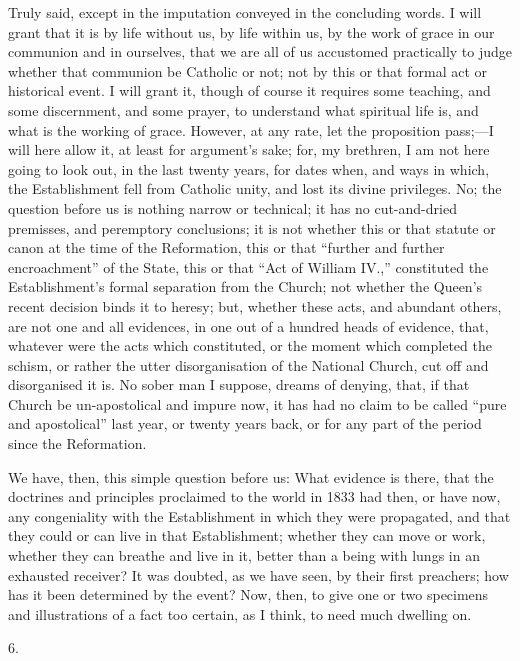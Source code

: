 Truly said, except in the imputation conveyed in the concluding
words. I will grant that it is by life without us, by life within us,
by the work of grace in our communion and in ourselves, that we are
all of us accustomed practically to judge whether that communion be
Catholic or not; not by this or that formal act or historical event. I
will grant it, though of course it requires some teaching, and some
discernment, and some prayer, to understand what spiritual life is,
and what is the working of grace. However, at any rate, let the
proposition pass;—I will here allow it, at least for argument's
sake; for, my brethren, I am not here going to look out, in the last
twenty years, for dates when, and ways in which, the Establishment
fell from Catholic unity, and lost its divine privileges. No; the
question before us is nothing narrow or technical; it has no
cut-and-dried premisses, and peremptory conclusions; it is not whether
this or that statute or canon at the time of the Reformation, this or
that ``further and further encroachment'' of the State, this
or that ``Act of William IV.,'' constituted the
Establishment's formal separation from the Church; not whether the
Queen's recent decision binds it to heresy; but, whether these acts,
and abundant others, are not one and all evidences, in one out of a
hundred heads of evidence, that, whatever were the acts which
constituted, or the moment which completed the schism, or rather the
utter disorganisation of the National Church, cut off and disorganised
it is. No sober man I suppose, dreams of denying, that, if that Church
be un-apostolical and impure now, it has had no claim to be called
``pure and apostolical'' last year, or twenty years back, or
for any part of the period since the Reformation.

We have, then, this simple question before us: What evidence is
there, that the doctrines and principles proclaimed to the world in
1833 had then, or have now, any congeniality with the Establishment in
which they were propagated, and that they could or can live in that
Establishment; whether they can move or work, whether they can breathe
and live in it, better than a being with lungs in an exhausted
receiver? It was doubted, as we have seen, by their first preachers;
how has it been determined by the event? Now, then, to give one or two
specimens and illustrations of a fact too certain, as I think, to need
much dwelling on.

6.

